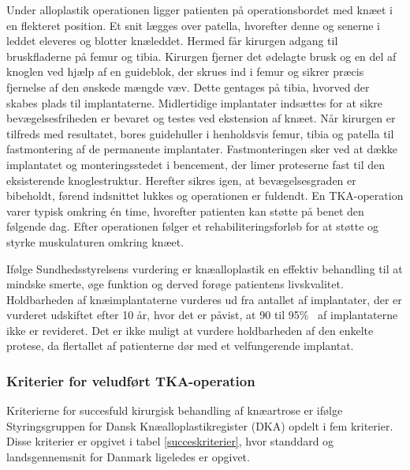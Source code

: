 Under alloplastik operationen ligger patienten  på operationsbordet med knæet i en flekteret position. Et snit lægges over patella, hvorefter denne og senerne i leddet eleveres og blotter knæleddet. Hermed får kirurgen adgang til bruskfladerne på femur og tibia. Kirurgen fjerner  det ødelagte brusk og en del af knoglen ved hjælp af en guideblok, der skrues ind i femur og sikrer præcis fjernelse af den ønskede mængde væv. Dette gentages på tibia, hvorved der skabes plads til implantaterne. Midlertidige implantater indsættes for at sikre bevægelsesfriheden er bevaret og testes ved ekstension af knæet. Når kirurgen er tilfreds med resultatet, bores guidehuller i henholdsvis femur, tibia og patella til fastmontering af de permanente implantater. Fastmonteringen sker ved at dække implantatet og monteringsstedet i bencement, der limer proteserne fast til den eksisterende knoglestruktur. Herefter sikres igen, at bevægelsesgraden er bibeholdt, førend indsnittet lukkes og operationen er fuldendt. En TKA-operation varer typisk omkring én time, hvorefter patienten kan støtte på benet den følgende dag. Efter operationen følger et rehabiliteringsforløb for at støtte og styrke muskulaturen omkring knæet. \citep{Sanna2013} \citep{tka-technique}

Ifølge Sundhedsstyrelsens vurdering er knæalloplastik en effektiv behandling til at mindske smerte, øge funktion og derved forøge patientens livskvalitet. Holdbarheden af knæimplantaterne vurderes ud fra antallet af implantater, der er vurderet udskiftet efter 10 år, hvor det er påvist, at 90 til 95\%~ af implantaterne ikke er revideret. Det er ikke muligt at vurdere holdbarheden af den enkelte protese, da flertallet af patienterne dør med et velfungerende implantat. \citep{brostrom2012}

\subsubsection{Kriterier for veludført TKA-operation}
Kriterierne for succesfuld kirurgisk behandling af knæartrose er ifølge Styringsgruppen for Dansk Knæalloplastikregister (DKA) opdelt i fem kriterier. \citep{aarsrapport2016} Disse kriterier er opgivet i tabel \ref{succeskriterier}, hvor standdard og landsgennemsnit for Danmark ligeledes er opgivet. 

